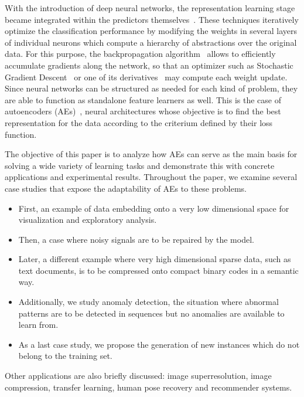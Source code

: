 \documentclass[
	fontsize=11pt, %
	twoside=false, %
	open=any, %
	secnumdepth=1, %
]{kaobook}
\begin{document}
With the introduction of deep neural networks, the representation learning stage became integrated within the predictors themselves~\cite{lecun-dl}. These techniques iteratively optimize the classification performance by modifying the weights in several layers of individual neurons which compute a hierarchy of abstractions over the original data. For this purpose, the backpropagation algorithm~\cite{rumelhart1988learning} allows to efficiently accumulate gradients along the network, so that an optimizer such as Stochastic Gradient Descent~\cite{robbins1951stochastic} or one of its derivatives~\cite{duchi2011adaptive,zeiler2012adadelta,kingma2015adam,tieleman2012lecture} may compute each weight update. Since neural networks can be structured as needed for each kind of problem, they are able to function as standalone feature learners as well. This is the case of autoencoders (AEs)~\cite{charte-tutorial}, neural architectures whose objective is to find the best representation for the data according to the criterium defined by their loss function.

The objective of this paper is to analyze how AEs can serve as the main basis for solving a wide variety of learning tasks and demonstrate this with concrete applications and experimental results. 
Throughout the paper, we examine several case studies that expose the adaptability of AEs to these problems.\begin{itemize}
    \item First, an example of data embedding onto a very low dimensional space for visualization and exploratory analysis. 
    \item Then, a case where noisy signals are to be repaired by the model.
    \item Later, a different example where very high dimensional sparse data, such as text documents, is to be compressed onto compact binary codes in a semantic way.
    \item Additionally, we study anomaly detection, the situation where abnormal patterns are to be detected in sequences but no anomalies are available to learn from.
    \item As a last case study, we propose the generation of new instances which do not belong to the training set.
\end{itemize}    

Other applications are also briefly discussed: image superresolution, image compression, transfer learning, human pose recovery and recommender systems. 
\end{document}
